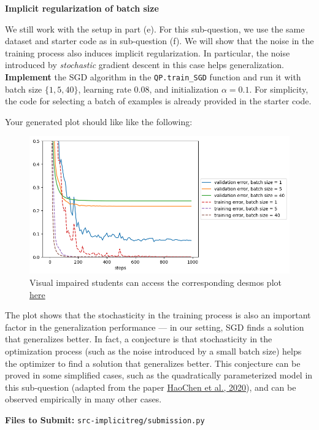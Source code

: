 \item {} \textbf{Implicit regularization of batch size}

We still work with the setup in part (e). For this sub-question, we use the same dataset and starter code as in sub-question (f). We will show that the noise in the training process also induces implicit regularization. In particular, the noise introduced by \emph{stochastic} gradient descent in this case helps generalization. \textbf{Implement} the SGD algorithm in the \texttt{QP.train\_SGD} function and run it with batch size $\{1, 5, 40\}$, learning rate $0.08$, and initialization $\alpha=0.1$. For simplicity, the code for selecting a batch of examples is already provided in the starter code.

Your generated plot should like like the following:

\begin{figure}[H]
    \centering
    \includegraphics[width=.7\linewidth]{04-implicitreg/implicitreg_quadratic_batchsize.png}
    \caption{Visual impaired students can access the corresponding desmos plot \href{https://www.desmos.com/calculator/0gdthqojwa}{here}}
\end{figure}

The plot shows that the stochasticity in the training process is also an important factor in the generalization performance --- in our setting, SGD finds a solution that generalizes better. In fact, a conjecture is that stochasticity in the optimization process (such as the noise introduced by a small batch size) helps the optimizer to find a solution that generalizes better. This conjecture can be proved in some simplified cases, such as the quadratically parameterized model in this sub-question (adapted from the paper \href{https://arxiv.org/abs/2006.08680}{HaoChen et al., 2020}), and can be observed empirically in many other cases.

\textbf{Files to Submit: }\texttt{src-implicitreg/submission.py}